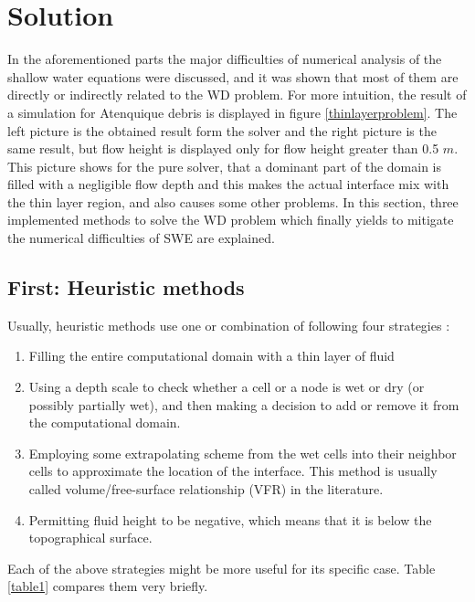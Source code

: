\documentclass[letterpaper,10pt]{article}
\begin{document}
\section{Solution}\label{solution}
In the aforementioned parts the major difficulties of numerical analysis of the shallow water
equations were discussed, and it was shown that most of them are directly or indirectly related to the WD problem.
For more intuition, the result of a simulation for Atenquique debris is displayed in figure \ref{thinlayerproblem}. 
The left picture is the obtained result form the solver and the right picture is the same result, but flow height is displayed 
only for flow height greater than 0.5 $m$. This picture shows for the pure solver, that a dominant part of the 
domain is filled with a negligible flow depth and this makes the actual interface mix with the thin layer region, and 
also causes some other problems. In this section, three implemented methods to solve the WD problem which finally yields to 
mitigate the numerical difficulties of SWE are explained. 


\subsection{First: Heuristic methods} \label{Heuristic}
Usually, heuristic methods use one or combination of following four strategies \cite{Medeiros2013}: 
\begin{enumerate}
 
 \item Filling the entire computational domain with a thin layer of fluid
 \item Using a depth scale to check whether a cell or a node is wet or dry 
 (or possibly partially wet), and then  making a decision to add or remove it 
 from the computational domain.
 \item Employing some extrapolating scheme from the wet cells into their neighbor 
 cells to approximate the location of the interface. This method is usually called 
 volume/free-surface relationship (VFR) in the literature.
 \item Permitting fluid height to be negative, which means that it is below the topographical surface.
\end{enumerate}
Each of the above strategies might be more useful for its specific case. Table \ref{table1} compares them very briefly.
\end{document}
